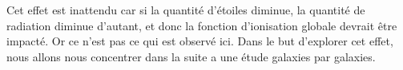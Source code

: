Cet effet est inattendu car si la quantité d'étoiles diminue, la quantité de radiation diminue d'autant, et donc la fonction d'ionisation globale devrait être impacté.
Or ce n'est pas ce qui est observé ici.
Dans le but d'explorer cet effet, nous allons nous concentrer dans la suite a une étude galaxies par galaxies.
